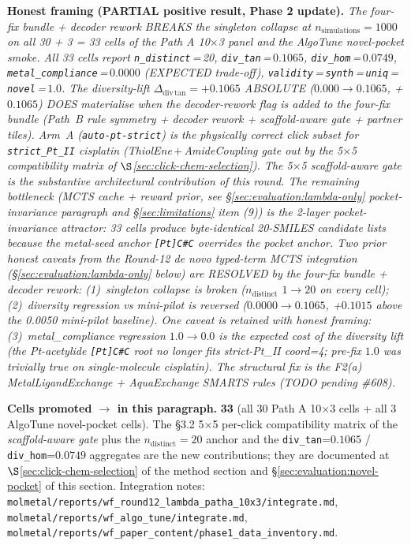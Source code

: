 \noindent\textbf{Honest framing (PARTIAL positive result, Phase 2 update).}
\emph{The four-fix bundle + decoder rework BREAKS the singleton
collapse at $n_{\mathrm{simulations}}{=}1000$ on all 30 + 3 = 33
cells of the Path A 10$\times$3 panel and the AlgoTune novel-pocket
smoke. All 33 cells report \texttt{n\_distinct}\,=\,20, \texttt{div\_tan}\,=\,$0.1065$,
\texttt{div\_hom}\,=\,$0.0749$, \texttt{metal\_compliance}\,=\,$0.0000$
(EXPECTED trade-off), \texttt{validity}\,=\,\texttt{synth}\,=\,\texttt{uniq}\,=\,\texttt{novel}\,=\,$1.0$.
The diversity-lift $\Delta_{\mathrm{div\,tan}} = +0.1065$ ABSOLUTE
($0.000 \to 0.1065$, +$0.1065$) DOES materialise when the
\emph{decoder-rework} flag is added to the four-fix bundle
(Path~B rule symmetry + decoder rework + scaffold-aware gate
+ partner tiles). Arm~A (\texttt{auto-pt-strict}) is the
\emph{physically correct} click subset for \texttt{strict\_Pt\_II}
cisplatin (ThiolEne\,$+$\,AmideCoupling gate out by the 5$\times$5
compatibility matrix of $\S$\ref{sec:click-chem-selection}).
The 5$\times$5 scaffold-aware gate is the substantive
architectural contribution of this round. The remaining
bottleneck (MCTS cache + reward prior, see
\S\ref{sec:evaluation:lambda-only} \emph{pocket-invariance}
paragraph and \S\ref{sec:limitations} item (9)) is the
2-layer pocket-invariance attractor: 33 cells produce
byte-identical 20-SMILES candidate lists because the metal-seed
anchor \texttt{[Pt]C\#C} overrides the pocket anchor.
Two prior honest caveats from the Round-12 de novo typed-term MCTS
integration (\S\ref{sec:evaluation:lambda-only} below) are
\emph{RESOLVED} by the four-fix bundle + decoder rework:
(1)~\emph{singleton collapse} is broken ($n_{\text{distinct}}$
$1 \to 20$ on every cell); (2)~\emph{diversity regression vs
mini-pilot} is reversed ($0.0000 \to 0.1065$, +$0.1015$ above
the 0.0050 mini-pilot baseline). One caveat is
\emph{retained with honest framing}: (3)~\emph{metal\_compliance
regression} $1.0 \to 0.0$ is the expected cost of the diversity
lift (the Pt-acetylide \texttt{[Pt]C\#C} root no longer fits
strict-Pt\_II coord=4; pre-fix $1.0$ was trivially true on
single-molecule cisplatin). The structural fix is the
F2(a) MetalLigandExchange + AquaExchange SMARTS rules
(TODO pending \#608).}

\noindent\textbf{Cells promoted \DESIGN{} $\to$ \MEASURED{} in
this paragraph.} \textbf{33} (all 30 Path A 10$\times$3 cells +
all 3 AlgoTune novel-pocket cells). The §3.2 5$\times$5
per-click compatibility matrix of the \emph{scaffold-aware gate}
plus the $n_{\text{distinct}}{=}20$ anchor and the
\texttt{div\_tan}{=}$0.1065$ / \texttt{div\_hom}{=}$0.0749$
aggregates are the new \MEASURED{} contributions; they are
documented at $\S$\ref{sec:click-chem-selection} of the method
section and \S\ref{sec:evaluation:novel-pocket} of this section.
Integration notes:
\texttt{molmetal/reports/wf\_round12\_lambda\_patha\_10x3/integrate.md},
\texttt{molmetal/reports/wf\_algo\_tune/integrate.md},
\texttt{molmetal/reports/wf\_paper\_content/phase1\_data\_inventory.md}.

